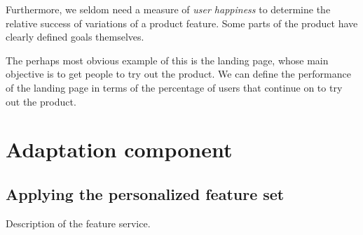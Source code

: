 Furthermore, we seldom need a measure of \emph{user happiness} to determine the relative success of variations of a product feature. Some parts of the product have clearly defined goals themselves.

The perhaps most obvious example of this is the landing page, whose main objective is to get people to try out the product. We can define the performance of the landing page in terms of the percentage of users that continue on to try out the product.

\section{Adaptation component} %
\label{approach:sec:adaptation_component}



\subsection{Applying the personalized feature set} %
\label{approach:sec:applying_the_personalized_feature_set}

Description of the feature service.
